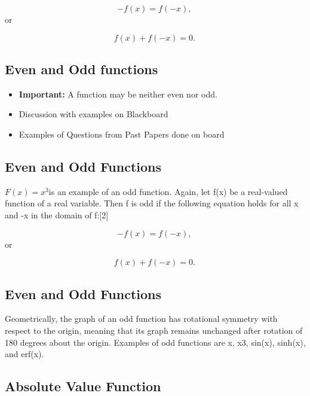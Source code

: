 \documentclass[a4paper,12pt]{article}
\begin{document}
\[-f(x) = f(-x), \,\]
or

\[f(x) + f(-x) = 0. \,\]



\subsection{Even and Odd functions}
\begin{itemize}
\item \textbf{Important:} A function may be neither even nor odd.
\item Discussion with examples on Blackboard
\item Examples of Questions from Past Papers done on board
\end{itemize}




\subsection{Even and Odd Functions}


$F(x) = x^3 $is an example of an odd function.
Again, let f(x) be a real-valued function of a real variable. Then f is odd if the following equation holds for all x and -x in the domain of f:[2]

\[-f(x) = f(-x), \,\]
or

\[f(x) + f(-x) = 0. \,\]


\subsection{Even and Odd Functions}

Geometrically, 
the graph of an odd function has rotational symmetry with respect to the origin, meaning that its graph remains unchanged after rotation of 180 degrees about the origin.
Examples of odd functions are x, x3, sin(x), sinh(x), and erf(x).




\newpage
\subsection*{Absolute Value Function}
\end{document}
